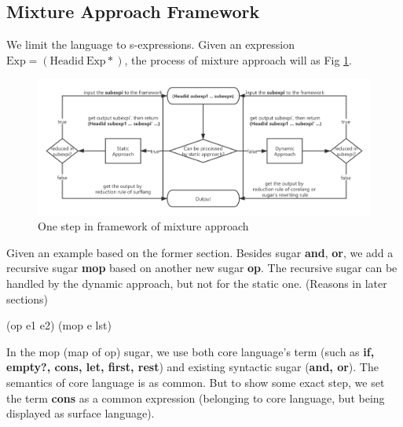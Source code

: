 \subsection{Mixture Approach Framework}
We limit the language to s-expressions. Given an expression $\mbox{Exp} = (\mbox{Headid}~\mbox{Exp}*)$, the process of mixture approach will as Fig \ref{fig:mixture}.

\begin{figure}[t]
	\centering
	\includegraphics[width=12cm]{images/mixture.png}
	\caption{One step in framework of mixture approach}
	\label{fig:mixture}
\end{figure}

Given an example based on the former section. Besides sugar {\bfseries and}, {\bfseries or}, we add a recursive sugar {\bfseries mop} based on another new sugar {\bfseries op}. The recursive sugar can be handled by the dynamic approach, but not for the static one. (Reasons in later sections)
\begin{Codes}
\small{(op e1 e2)} 
\small{(mop e lst)}  
\end{Codes}

In the mop (map of op) sugar, we use both core language's term (such as {\bfseries if, empty?, cons, let, first, rest}) and existing syntactic sugar ({\bfseries and, or}). The semantics of core language is as common. But to show some exact step, we set the term {\bfseries cons} as a common expression (belonging to core language, but being displayed as surface language).


